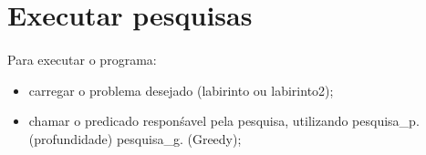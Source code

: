 \documentclass{article}
\begin{document}
\section{Executar pesquisas}
\paragraph{} Para executar o programa:
\begin{itemize}
  \item carregar o problema desejado (labirinto ou labirinto2);
  \item chamar o predicado responśavel pela pesquisa, utilizando pesquisa\_p.  (profundidade) pesquisa\_g. (Greedy);
\end{itemize}
\end{document}
